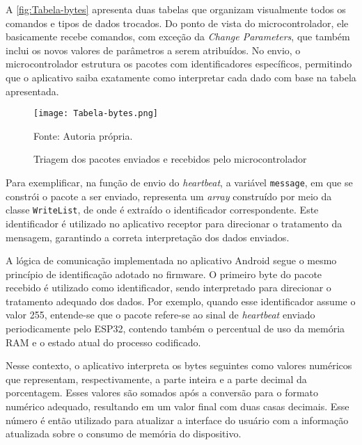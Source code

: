 A \autoref{fig:Tabela-bytes} apresenta duas tabelas que organizam visualmente todos os comandos e tipos de dados trocados. Do ponto de vista do microcontrolador, ele basicamente recebe comandos, com exceção da \textit{Change Parameters}, que também inclui os novos valores de parâmetros a serem atribuídos. No envio, o microcontrolador estrutura os pacotes com identificadores específicos, permitindo que o aplicativo saiba exatamente como interpretar cada dado com base na tabela apresentada.

\begin{figure}
    \centering
    \caption{Triagem dos pacotes enviados e recebidos pelo microcontrolador}
    \label{fig:Tabela-bytes}
    \texttt{[image: Tabela-bytes.png]}

    {\centering\footnotesize Fonte: Autoria própria.\par}
\end{figure}

Para exemplificar, na função de envio do \textit{heartbeat}, a variável \texttt{message}, em que se constrói o pacote a ser enviado, representa um \textit{array} construído por meio da classe \texttt{WriteList}, de onde é extraído o identificador correspondente. Este identificador é utilizado no aplicativo receptor para direcionar o tratamento da mensagem, garantindo a correta interpretação dos dados enviados.

\begin{figure}[H]

\end{figure}   

A lógica de comunicação implementada no aplicativo Android segue o mesmo princípio de identificação adotado no firmware. O primeiro byte do pacote recebido é utilizado como identificador, sendo interpretado para direcionar o tratamento adequado dos dados. Por exemplo, quando esse identificador assume o valor 255, entende-se que o pacote refere-se ao sinal de \textit{heartbeat} enviado periodicamente pelo ESP32, contendo também o percentual de uso da memória RAM e o estado atual do processo codificado.

Nesse contexto, o aplicativo interpreta os bytes seguintes como valores numéricos que representam, respectivamente, a parte inteira e a parte decimal da porcentagem. Esses valores são somados após a conversão para o formato numérico adequado, resultando em um valor final com duas casas decimais. Esse número é então utilizado para atualizar a interface do usuário com a informação atualizada sobre o consumo de memória do dispositivo.

